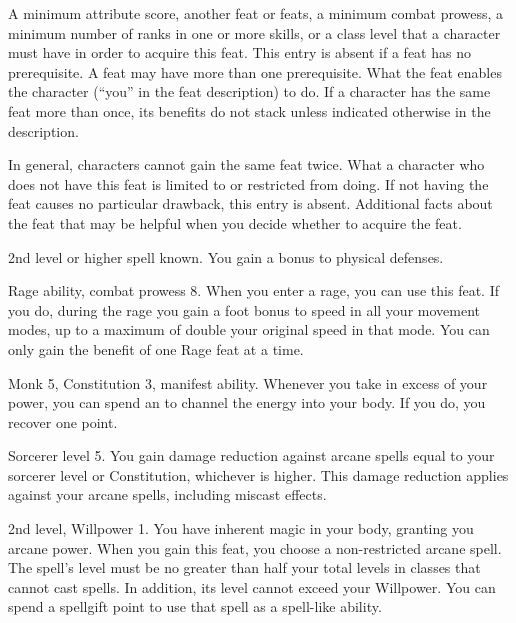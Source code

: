 \featpre A minimum attribute score, another feat or feats, a minimum combat prowess, a minimum number of ranks in one or more skills, or a class level that a character must have in order to acquire this feat.
This entry is absent if a feat has no prerequisite.
A feat may have more than one prerequisite.
\featben What the feat enables the character (``you'' in the feat description) to do.
If a character has the same feat more than once, its benefits do not stack unless indicated otherwise in the description.
\par In general, characters cannot gain the same feat twice.
What a character who does not have this feat is limited to or restricted from doing.
If not having the feat causes no particular drawback, this entry is absent.
Additional facts about the feat that may be helpful when you decide whether to acquire the feat.

\featpre 2nd level or higher  spell known.
\featben You gain a  bonus to physical defenses.

\featpres Rage ability, combat prowess 8.
\featben When you enter a rage, you can use this feat. If you do, during the rage you gain a  foot bonus to speed in all your movement modes, up to a maximum of double your original speed in that mode.
 You can only gain the benefit of one Rage feat at a time.

\featpre Monk 5, Constitution 3, manifest \ki ability.
\featben Whenever you take  in excess of your \ki power, you can spend an  to channel the energy into your body.
If you do, you recover one \ki point.

\featpre Sorcerer level 5.
\featben You gain damage reduction against arcane spells equal to your sorcerer level or Constitution, whichever is higher.
This damage reduction applies against your arcane spells, including miscast effects.

\featpres 2nd level, Willpower 1.
\featben You have inherent magic in your body, granting you arcane power.
When you gain this feat, you choose a non-restricted arcane spell.
The spell's level must be no greater than half your total levels in classes that cannot cast spells.
In addition, its level cannot exceed your Willpower.
You can spend a spellgift point to use that spell as a spell-like ability.

